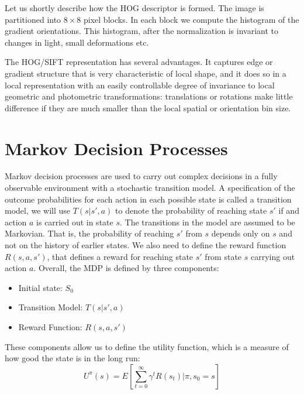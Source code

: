         Let us shortly describe how the HOG descriptor is formed. The image is
        partitioned into $8 \times 8$ pixel blocks. In each block we compute the
        histogram of the gradient orientations. This histogram, after the
        normalization is invariant to changes in light, small deformations etc.

        The HOG/SIFT representation has several advantages. It captures edge or
        gradient structure that is very characteristic of local shape, and it does
        so in a local representation with an easily controllable degree of
        invariance to local geometric and photometric transformations:
        translations or rotations make little difference if they are much smaller
        than the local spatial or orientation bin size.


    \section{Markov Decision Processes}\label{sec:markov_descision_processes}
        Markov decision processes are used to carry out complex decisions in a fully
        observable environment with a stochastic transition model.
        A specification of the outcome probabilities for each action in each possible state is
        called a transition model, we will use $T(s| s', a)$ to denote the
        probability of reaching state $s'$ if and action $a$ is carried out in state
        $s$.
        The transitions in the model are assumed to be Markovian. That is, the probability of
        reaching $s'$ from $s$ depends only on $s$ and not on the history of earlier
        states.
        We also need to define the reward function $R(s, a, s')$, that defines a reward
        for reaching state $s'$ from state $s$ carrying out action $a$.
        Overall, the MDP is defined by three components:
        \begin{itemize}
            \item Initial state: $S_0$
            \item Transition Model: $T(s| s', a)$
            \item Reward Function: $R(s, a, s')$
        \end{itemize}
        These components allow us to define the utility function, which is a measure of
        how good the state is in the long run:
        \begin{equation}
        U^{\pi}(s) = E\left[\sum_{t=0}^{\infty} \gamma^t R(s_t) | \pi,s_0 = s \right]
        \end{equation}
